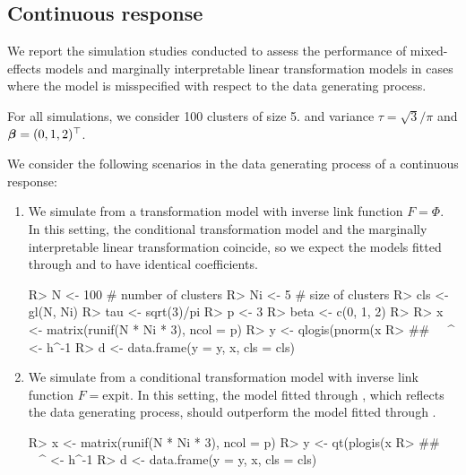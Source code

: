 \documentclass[article,nojss,shortnames]{jss}\usepackage[]{graphicx}\usepackage[]{xcolor}
\newcommand{\expit}{\text{expit}}
\newcommand{\pN}{\Phi}
\newcommand{\shiftparm}{\betavec}
\def \betavec         {\text{\boldmath$\beta$}}
\begin{document}
\subsection{Continuous response}
We report the simulation studies conducted to assess the performance of
mixed-effects models and marginally interpretable linear transformation models
in cases where the model is misspecified with respect to the data generating 
process.

For all simulations, we consider 100 clusters of size 5.
and variance $\tau = \sqrt{3}/\pi$ and $\shiftparm = (0, 1, 2)^\top$.


We consider the following scenarios in the data generating process of a continuous
response:
\begin{enumerate}
\item We simulate from a transformation model with inverse link function
      $F = \pN$. In this setting, the conditional transformation model and the
      marginally interpretable linear transformation coincide, so we expect the models 
      fitted through  and  to have identical
      coefficients.
\begin{Schunk}
\begin{Sinput}
R> N <- 100 # number of clusters
R> Ni <- 5  # size of clusters
R> cls <- gl(N, Ni)
R> tau <- sqrt(3)/pi
R> p <- 3
R> beta <- c(0, 1, 2)
R> 
R> x <- matrix(runif(N * Ni * 3), ncol = p)
R> y <- qlogis(pnorm(x %*% beta + rnorm(N, sd = tau)[cls] + rnorm(nrow(x))))
R> ##   ^^^^^^^^^^^^^ <- h^{-1}
R> d <- data.frame(y = y, x, cls = cls)
\end{Sinput}
\end{Schunk}
      
\item We simulate from a conditional transformation model with inverse link 
      function $F = \expit$. In this setting, the model fitted through 
      , which reflects the data generating process,
      should outperform the model fitted through .
\begin{Schunk}
\begin{Sinput}
R> x <- matrix(runif(N * Ni * 3), ncol = p)
R> y <- qt(plogis(x %*% beta + rnorm(N, sd = tau)[cls] + rlogis(nrow(x))), df = 3)
R> ##   ^^^^^^^^^^ <- h^{-1}
R> d <- data.frame(y = y, x, cls = cls)
\end{Sinput}
\end{Schunk}
      

\end{enumerate}
\end{document}
